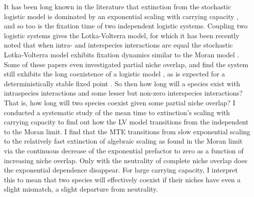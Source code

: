 It has been long known in the literature that extinction from the stochastic logistic model is dominated by an exponential scaling with carrying capacity \cite{Norden1982,Kamenev2008,Assaf2010,Ovaskainen2010}, and so too is the fixation time of two independent logistic systems. 
Coupling two logistic systems gives the Lotka-Volterra model, for which it has been recently noted that when intra- and interspecies interactions are equal the stochastic Lotka-Volterra model exhibits fixation dynamics similar to the Moran model \cite{Lin2012,Constable2015,Chotibut2015,Young2018}. 
Some of these papers even investigated partial niche overlap, and find the system still exhibits the long coexistence of a logistic model \cite{Constable2015,Chotibut2015,Young2018}, as is expected for a deterministically stable fixed point \cite{Hanggi1990}. %
So then how long will a species exist with intraspecies interactions and some lesser but non-zero interspecies interactions? That is, how long will two species coexist given some partial niche overlap? 
I conducted a systematic study of the mean time to extinction's scaling with carrying capacity to find out how the LV model transitions from the independent to the Moran limit. 
I find that the MTE transitions from slow exponential scaling to the relatively fast extinction of algebraic scaling as found in the Moran limit via the continuous decrease of the exponential prefactor to zero as a function of increasing niche overlap. 
Only with the neutrality of complete niche overlap does the exponential dependence disappear. 
For large carrying capacity, I interpret this to mean that two species will effectively coexist if their niches have even a slight mismatch, a slight departure from neutrality. %

